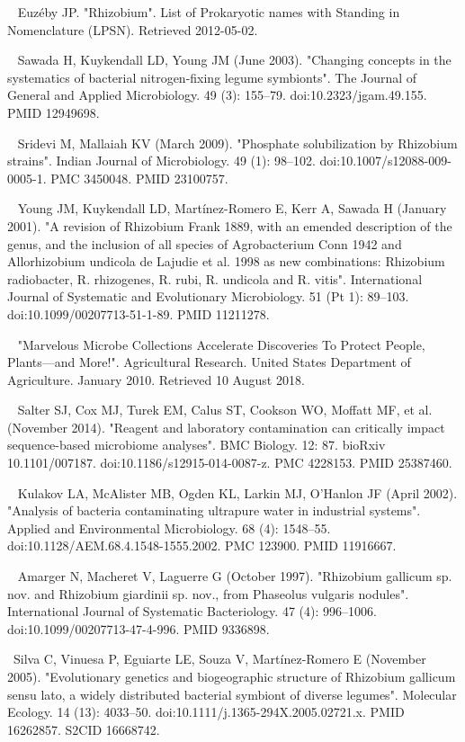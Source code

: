 \documentclass[11pt]{article}
\begin{document}
\begin{thebibliography}{3}
	~  Euzéby JP. "Rhizobium". List of Prokaryotic names with Standing in Nomenclature (LPSN). Retrieved 2012-05-02.
	
	~ Sawada H, Kuykendall LD, Young JM (June 2003). "Changing concepts in the systematics of bacterial nitrogen-fixing legume symbionts". The Journal of General and Applied Microbiology. 49 (3): 155–79. doi:10.2323/jgam.49.155. PMID 12949698.
	
	~ Sridevi M, Mallaiah KV (March 2009). "Phosphate solubilization by Rhizobium strains". Indian Journal of Microbiology. 49 (1): 98–102. doi:10.1007/s12088-009-0005-1. PMC 3450048. PMID 23100757.
	
	~ Young JM, Kuykendall LD, Martínez-Romero E, Kerr A, Sawada H (January 2001). "A revision of Rhizobium Frank 1889, with an emended description of the genus, and the inclusion of all species of Agrobacterium Conn 1942 and Allorhizobium undicola de Lajudie et al. 1998 as new combinations: Rhizobium radiobacter, R. rhizogenes, R. rubi, R. undicola and R. vitis". International Journal of Systematic and Evolutionary Microbiology. 51 (Pt 1): 89–103. doi:10.1099/00207713-51-1-89. PMID 11211278.
	
	~ "Marvelous Microbe Collections Accelerate Discoveries To Protect People, Plants—and More!". Agricultural Research. United States Department of Agriculture. January 2010. Retrieved 10 August 2018.
	
	~ Salter SJ, Cox MJ, Turek EM, Calus ST, Cookson WO, Moffatt MF, et al. (November 2014). "Reagent and laboratory contamination can critically impact sequence-based microbiome analyses". BMC Biology. 12: 87. bioRxiv 10.1101/007187. doi:10.1186/s12915-014-0087-z. PMC 4228153. PMID 25387460.
	
	~ Kulakov LA, McAlister MB, Ogden KL, Larkin MJ, O'Hanlon JF (April 2002). "Analysis of bacteria contaminating ultrapure water in industrial systems". Applied and Environmental Microbiology. 68 (4): 1548–55. doi:10.1128/AEM.68.4.1548-1555.2002. PMC 123900. PMID 11916667.
	
	~ Amarger N, Macheret V, Laguerre G (October 1997). "Rhizobium gallicum sp. nov. and Rhizobium giardinii sp. nov., from Phaseolus vulgaris nodules". International Journal of Systematic Bacteriology. 47 (4): 996–1006. doi:10.1099/00207713-47-4-996. PMID 9336898.
	
	~Silva C, Vinuesa P, Eguiarte LE, Souza V, Martínez-Romero E (November 2005). "Evolutionary genetics and biogeographic structure of Rhizobium gallicum sensu lato, a widely distributed bacterial symbiont of diverse legumes". Molecular Ecology. 14 (13): 4033–50. doi:10.1111/j.1365-294X.2005.02721.x. PMID 16262857. S2CID 16668742.
	

\end{thebibliography}
\end{document}
